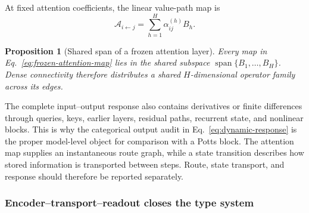 \documentclass[10pt]{article}
\newcommand{\Span}{\operatorname{span}}
\newtheorem{proposition}[theorem]{Proposition}
\theoremstyle{definition}
\theoremstyle{remark}
\newcommand{\BookSubsection}[1]{\subsubsection{#1}}
\begin{document}
At fixed attention coefficients, the linear value-path map is
\begin{equation}
\mathcal A_{i\leftarrow j}
=\sum_{h=1}^H\alpha_{ij}^{(h)}B_h.
\label{eq:frozen-attention-map}
\end{equation}

\begin{proposition}[Shared span of a frozen attention layer]
\label{prop:attention-span}
Every map in Eq.~\ref{eq:frozen-attention-map} lies in the shared subspace
$\Span\{B_1,\ldots,B_H\}$.  Dense connectivity therefore distributes a shared $H$-dimensional
operator family across its edges.
\end{proposition}

The complete input--output response also contains derivatives or finite differences through
queries, keys, earlier layers, residual paths, recurrent state, and nonlinear blocks.  This is why
the categorical output audit in Eq.~\ref{eq:dynamic-response} is the proper model-level object for
comparison with a Potts block.  The attention map supplies an instantaneous route graph, while a
state transition describes how stored information is transported between steps.  Route, state
transport, and response should therefore be reported separately.

\BookSubsection{Encoder--transport--readout closes the type system}
\end{document}
